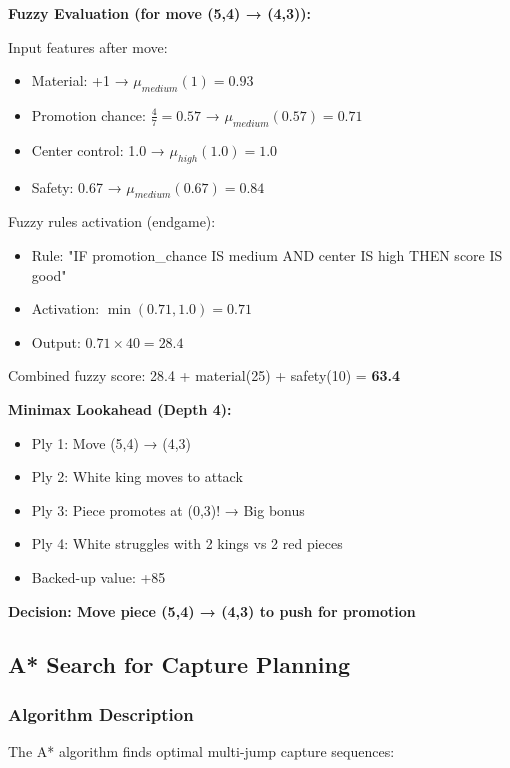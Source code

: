 \documentclass[12pt,a4paper]{article}
\begin{document}
\textbf{Fuzzy Evaluation (for move (5,4) → (4,3)):}

Input features after move:
\begin{itemize}
    \item Material: +1 → $\mu_{medium}(1) = 0.93$
    \item Promotion chance: $\frac{4}{7} = 0.57$ → $\mu_{medium}(0.57) = 0.71$
    \item Center control: 1.0 → $\mu_{high}(1.0) = 1.0$
    \item Safety: 0.67 → $\mu_{medium}(0.67) = 0.84$
\end{itemize}

Fuzzy rules activation (endgame):
\begin{itemize}
    \item Rule: "IF promotion\_chance IS medium AND center IS high THEN score IS good"
    \item Activation: $\min(0.71, 1.0) = 0.71$
    \item Output: $0.71 \times 40 = 28.4$
\end{itemize}

Combined fuzzy score: 28.4 + material(25) + safety(10) = \textbf{63.4}

\textbf{Minimax Lookahead (Depth 4):}
\begin{itemize}
    \item Ply 1: Move (5,4) → (4,3)
    \item Ply 2: White king moves to attack
    \item Ply 3: Piece promotes at (0,3)! → Big bonus
    \item Ply 4: White struggles with 2 kings vs 2 red pieces
    \item Backed-up value: +85
\end{itemize}

\textbf{Decision: Move piece (5,4) → (4,3) to push for promotion}

\subsection{A* Search for Capture Planning}

\subsubsection{Algorithm Description}

The A* algorithm finds optimal multi-jump capture sequences:
\end{document}
